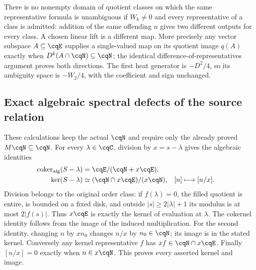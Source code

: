 There is no nonempty domain of quotient classes on which the same
representative formula is unambiguous if $W_k\ne0$ and every
representative of a class is admitted: addition of the same offending
$n$ gives two different outputs for every class. A chosen linear
lift is a different map. More precisely any vector subspace
$A\subseteq\cqE$ supplies a single-valued map on its quotient image
$q(A)$ exactly when $D^k(A\cap\cqN)\subseteq\cqN$; the identical
difference-of-representatives argument proves both directions.
The first heat generator is $-D^2/4$, so its ambiguity space is
$-W_2/4$, with the coefficient and sign unchanged.

\subsection{Exact algebraic spectral defects of the source relation}
\label{sec:cq-sourcealgebra}
These calculations keep the actual $\cqN$ and require only the
already proved $M\cqN\subseteq\cqN$. For every $\lambda\in\cqC$,
division by $x=s-\lambda$ gives the algebraic identities
\begin{equation}\label{eq:cq-source-kercoker}
 \begin{aligned}
 \operatorname{coker}_{\rm alg}(S-\lambda)
     &=\cqE/(\cqN+x\cqE),\\
 \ker(S-\lambda)&\simeq
        (\cqN\cap x\cqE)/(x\cqN),
        & [n]&\longmapsto[n/x].
 \end{aligned}
\end{equation}
Division belongs to the original order class: if $f(\lambda)=0$,
the filled quotient is entire, is bounded on a fixed disk, and
outside $|s|\geq2|\lambda|+1$ its modulus is at most $2|f(s)|$.
Thus $x\cqE$ is exactly the kernel of evaluation at $\lambda$.
The cokernel identity follows from the image of the induced
multiplication. For the second identity, changing $n$ by $xn_0$
changes $n/x$ by $n_0\in\cqN$; its image is in the stated
kernel. Conversely any kernel representative $f$ has
$xf\in\cqN\cap x\cqE$. Finally $[n/x]=0$ exactly when
$n\in x\cqN$. This proves every asserted kernel and image.

